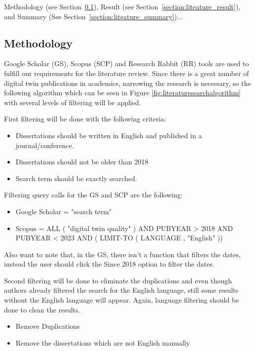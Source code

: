 \documentclass[9pt,conference]{IEEEtran}
\begin{document}
    Methodology (see Section~\ref{section:liteature_methodology}), Result (see Section~\ref{section:liteature_result}), and Summary (See Section~\ref{section:liteature_summary})...

    \subsection{Methodology}
    \label{section:liteature_methodology}
    Google Scholar (GS), Scopus (SCP) and Research Rabbit (RR) tools are used to fulfill our requirements for the literature review. 
    Since there is a great number of digital twin publications in academics, 
    narrowing the research is necessary, so the following algorithm which can be seen in Figure \ref{fig:literaturesearchalgorithm} with several levels of filtering will be applied.
    
    First filtering will be done with the following criteria:
    \begin{itemize}
        \item Dissertations should be written in English and published in a journal/conference.
        \item Dissertations should not be older than 2018
        \item Search term should be exactly searched.
    \end{itemize}

    Filtering query calls for the GS and SCP are the following:
    \begin{itemize}
        \item Google Scholar = "search term"
        \item Scopus = ALL ( "digital twin quality" ) AND PUBYEAR > 2018 AND PUBYEAR < 2023 AND ( LIMIT-TO ( LANGUAGE , "English" )) 
    \end{itemize} 

    Also want to note that, in the GS, there isn't a function that filters the dates, instead the user should click the Since 2018 option to filter the dates.

    Second filtering will be done to eliminate the duplications and even though authors already filtered the search for the English language,
    still some results without the English language will appear. Again, language filtering should be done to clean the results.
    \begin{itemize}
        \item Remove Duplications
        \item Remove the dissertations which are not English manually
    \end{itemize}  
    
\end{document}
